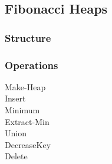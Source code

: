 \subsection{Fibonacci Heaps}

\subsubsection{Structure}
\subsubsection{Operations}

\begin{description}
\item[Make-Heap]
\item[Insert]
\item[Minimum]
\item[Extract-Min]
\item[Union]
\item[DecreaseKey]
\item[Delete]
\end{description}